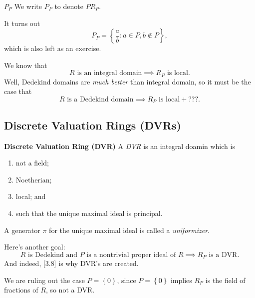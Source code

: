 \documentclass[pmath441]{subfiles}
\begin{document}
    \begin{notation}{$P_P$}
        We write $P_P$ to denote $PR_P$.
    \end{notation}
    
    \np It turns out
    \begin{equation*}
        P_P = \left\lbrace \frac{a}{b}: a\in P, b\notin P \right\rbrace,
    \end{equation*}
    which is also left as an exercise.

    \np We know that
    \begin{equation*}
        R\text{ is an integral domain} \implies R_P \text{ is local}.
    \end{equation*}
    Well, Dedekind domains are \textit{much better} than integral domain, so it must be the case that
    \begin{equation*}
        R\text{ is a Dedekind domain} \implies R_P \text{ is local} + \text{???}.
    \end{equation*}

    \subsection{Discrete Valuation Rings (DVRs)}
    
    \begin{definition}{\textbf{Discrete Valuation Ring (DVR)}}
        A \emph{DVR} is an integral doamin which is
        \begin{enumerate}
            \item not a field;
            \item Noetherian;
            \item local; and
            \item such that the unique maximal ideal is principal.
        \end{enumerate}
        A generator $\pi$ for the unique maximal ideal is called a \emph{uniformizer}.
    \end{definition}
    
    \np Here's another goal:
    \begin{equation}
        \text{$R$ is Dedekind and $P$ is a nontrivial proper ideal of $R$} \implies R_P\text{ is a DVR}.
    \end{equation}
    And indeed, [3.8] is why DVR's are created.

    \np We are ruling out the case $P = \left\lbrace 0 \right\rbrace$, since $P = \left\lbrace 0 \right\rbrace$ implies $R_P$ is the field of fractions of $R$, so not a DVR.
\end{document}
